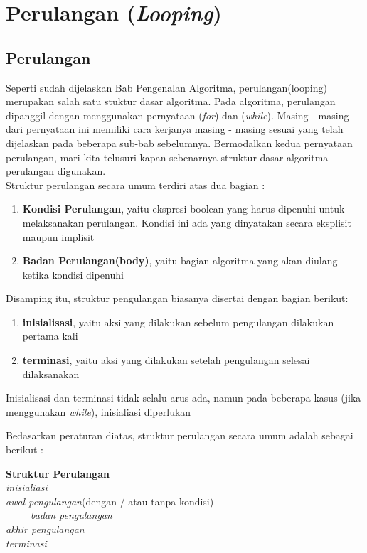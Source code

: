 \chapter{Perulangan (\textit{Looping})}

\section{Perulangan}
Seperti sudah dijelaskan Bab Pengenalan Algoritma, perulangan(looping) merupakan salah satu stuktur dasar algoritma. Pada algoritma, perulangan dipanggil dengan menggunakan pernyataan (\textit{for}) dan (\textit{while}). Masing - masing dari pernyataan ini memiliki cara kerjanya masing - masing sesuai yang telah dijelaskan pada beberapa sub-bab sebelumnya. Bermodalkan kedua pernyataan perulangan, mari kita telusuri kapan sebenarnya struktur dasar algoritma perulangan digunakan.  \\

Struktur perulangan secara umum terdiri atas dua bagian : 
\begin{enumerate}
	\item \textbf{Kondisi Perulangan}, yaitu ekspresi boolean yang harus dipenuhi untuk melaksanakan perulangan. Kondisi ini ada yang dinyatakan secara eksplisit maupun implisit
		\item \textbf{Badan Perulangan(body)}, yaitu bagian algoritma yang akan diulang ketika kondisi dipenuhi
\end{enumerate}

Disamping itu, struktur pengulangan biasanya disertai dengan bagian berikut: 
\begin{enumerate}
	\item \textbf{inisialisasi}, yaitu aksi yang dilakukan sebelum pengulangan dilakukan pertama kali 
	\item \textbf{terminasi}, yaitu aksi yang dilakukan setelah pengulangan selesai dilaksanakan
\end{enumerate}
Inisialisasi dan terminasi tidak selalu arus ada, namun pada beberapa kasus (jika menggunakan \textit{while}), inisialiasi diperlukan

Bedasarkan peraturan diatas, struktur perulangan secara umum adalah sebagai berikut : 
\begin{Petunjuk}
\label{Ptk:Struktur Perulangan}
	\textbf{Struktur Perulangan}\\
		\textit{inisialiasi}\\
		\textit{awal pengulangan}(dengan / atau tanpa kondisi)\\
		~~~~~\textit{badan pengulangan}\\
		\textit{akhir pengulangan}\\
		\textit{terminasi}\\
\end{Petunjuk}

